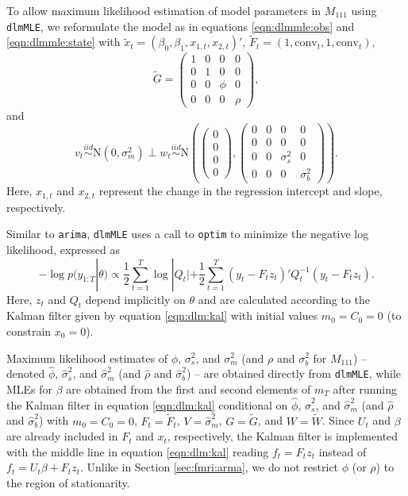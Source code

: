 To allow maximum likelihood estimation of model parameters in $M_{111}$ using {\tt dlmMLE}, we reformulate the model as in equations \eqref{eqn:dlmmle:obs} and \eqref{eqn:dlmmle:state} with $\tilde{x}_t = (\beta_0,\beta_1,x_{1,t},x_{2,t})'$, $\tilde{F}_t = (1,\mbox{conv}_t,1,\mbox{conv}_t)$,
\[\tilde{G} = \left(\begin{array}{cccc} 1 & 0 & 0 & 0 \\ 0 & 1 & 0 & 0 \\ 0 & 0 & \phi & 0 \\ 0 & 0 & 0 & \rho \end{array}\right), \]
and \[v_t \stackrel{iid}{\sim} \mbox{N}(0,\sigma^2_m) \perp w_t \stackrel{iid}{\sim} \mbox{N}\left(\left(\begin{array}{c} 0 \\ 0 \\ 0 \\ 0 \end{array}\right), \left(\begin{array}{cccc} 0 & 0 & 0 & 0 \\ 0 & 0 & 0 & 0 \\ 0 & 0 & \sigma^2_s & 0 \\  0 & 0 & 0 & \sigma^2_b \end{array}\right)\right).\]
Here, $x_{1,t}$ and $x_{2,t}$ represent the change in the regression intercept and slope, respectively.

Similar to {\tt arima}, {\tt dlmMLE} uses a call to {\tt optim} to minimize the negative log likelihood, expressed as
\begin{equation}
-\log p(y_{1:T}|\theta) \propto \frac{1}{2}\sum_{t=1}^T \log |Q_t| + \frac{1}{2}\sum_{t=1}^T (y_t-F_tz_t)'Q_t^{-1}(y_t-F_tz_t). \label{eqn:fmri:dlmll}
\end{equation}
Here, $z_t$ and $Q_t$ depend implicitly on $\theta$ and are calculated according to the Kalman filter given by equation \eqref{eqn:dlm:kal} with initial values $m_0 = C_0 = 0$ (to constrain $x_0 = 0$).

Maximum likelihood estimates of $\phi$, $\sigma^2_s$, and $\sigma^2_m$ (and $\rho$ and $\sigma^2_b$ for $M_{111}$) -- denoted $\hat{\phi}$, $\hat{\sigma}^2_s$, and $\hat{\sigma}^2_m$ (and $\hat{\rho}$ and $\hat{\sigma}^2_b$) -- are obtained directly from {\tt dlmMLE}, while MLEs for $\beta$ are obtained from the first and second elements of $m_T$ after running the Kalman filter in equation \eqref{eqn:dlm:kal} conditional on $\hat{\phi}$, $\hat{\sigma}^2_s$, and $\hat{\sigma}^2_m$ (and $\hat{\rho}$ and $\hat{\sigma}^2_b$) with $m_0 = C_0 = 0$, $F_t = \tilde{F}_t$, $V = \hat{\sigma}^2_m$, $G = \tilde{G}$, and $W = \tilde{W}$. Since $U_t$ and $\beta$ are already included in $F_t$ and $x_t$, respectively, the Kalman filter is implemented with the middle line in equation \eqref{eqn:dlm:kal} reading $f_t = F_tz_t$ instead of $f_t = U_t\beta + F_tz_t$. Unlike in Section \ref{sec:fmri:arma}, we do not restrict $\phi$ (or $\rho$) to the region of stationarity.

